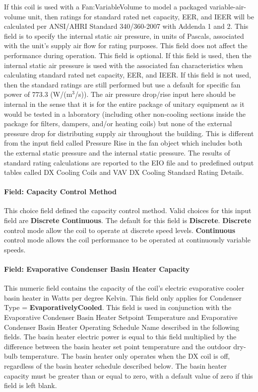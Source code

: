 If this coil is used with a Fan:VariableVolume to model a packaged variable-air-volume unit, then ratings for standard rated net capacity, EER, and IEER will be calculated per ANSI/AHRI Standard 340/360-2007 with Addenda 1 and 2. This field is to specify the internal static air pressure, in units of Pascals, associated with the unit's supply air flow for rating purposes. This field does not affect the performance during operation. This field is optional. If this field is used, then the internal static air pressure is used with the associated fan characteristics when calculating standard rated net capacity, EER, and IEER. If this field is not used, then the standard ratings are still performed but use a default for specific fan power of 773.3 (W/(m\(^{3}\)/s)). The air pressure drop/rise input here should be internal in the sense that it is for the entire package of unitary equipment as it would be tested in a laboratory (including other non-cooling sections inside the package for filters, dampers, and/or heating coils) but none of the external pressure drop for distributing supply air throughout the building. This is different from the input field called Pressure Rise in the fan object which includes both the external static pressure and the internal static pressure. The results of standard rating calculations are reported to the EIO file and to predefined output tables called DX Cooling Coils and VAV DX Cooling Standard Rating Details.

\paragraph{Field: Capacity Control Method}

This choice field defined the capacity control method. Valid choices for this input field are \textbf{Discrete} \textbf{Continuous}. The default for this field is \textbf{Discrete}. \textbf{Discrete} control mode allow the coil to operate at discrete speed levels. \textbf{Continuous} control mode allows the coil performance to be operated at continuously variable speeds.

\paragraph{Field: Evaporative Condenser Basin Heater Capacity}\label{field-evaporative-condenser-basin-heater-capacity-000}

This numeric field contains the capacity of the coil's electric evaporative cooler basin heater in Watts per degree Kelvin. This field only applies for Condenser Type = \textbf{EvaporativelyCooled}. This field is used in conjunction with the Evaporative Condenser Basin Heater Setpoint Temperature and Evaporative Condenser Basin Heater Operating Schedule Name described in the following fields. The basin heater electric power is equal to this field multiplied by the difference between the basin heater set point temperature and the outdoor dry-bulb temperature. The basin heater only operates when the DX coil is off, regardless of the basin heater schedule described below. The basin heater capacity must be greater than or equal to zero, with a default value of zero if this field is left blank.

